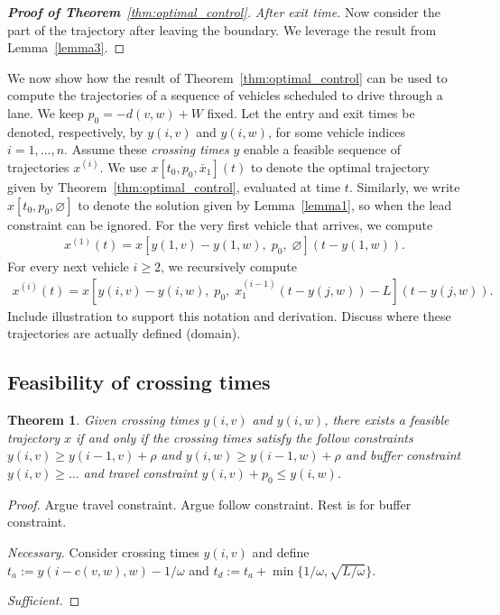 \documentclass[a4paper]{article}
\theoremstyle{definition}
\theoremstyle{plain}
\newtheorem{theorem}{Theorem\hspace{0.25em}\ignorespaces}
\begin{document}
\begin{proof}[\normalfont\textbf{Proof of Theorem}~\ref{thm:optimal_control}]
\vspace{0.5em}
\noindent
\textit{After exit time.}\; Now consider the part of the trajectory after
leaving the boundary. We leverage the result from Lemma~\ref{lemma3}.
\end{proof}

We now show how the result of Theorem~\ref{thm:optimal_control} can be used to
compute the trajectories of a sequence of vehicles scheduled to drive through a
lane. We keep $p_{0} = -d(v,w) + W$ fixed.
%
Let the entry and exit times be denoted, respectively, by $y(i, v)$ and
$y(i, w)$, for some vehicle indices $i = 1, \dots, n$. Assume these
\textit{crossing times} $y$ enable a feasible sequence of trajectories $x^{(i)}$.
%
We use $x[t_{0}, p_{0}, \bar{x}_{1}](t)$ to denote the optimal trajectory given
by Theorem~\ref{thm:optimal_control}, evaluated at time $t$. Similarly, we write
$x[t_{0}, p_{0}, \varnothing]$ to denote the solution given by
Lemma~\ref{lemma1}, so when the lead constraint can be ignored.
%
For the very first vehicle that arrives, we compute
\begin{align*}
  x^{(1)}(t) = x[y(1,v)-y(1,w), \; p_{0}, \; \varnothing](t - y(1,w)) .
\end{align*}
For every next vehicle $i \geq 2$, we recursively compute
\begin{align*}
  x^{(i)}(t) = x[y(i,v)-y(i,w), \; p_{0}, \; x_{1}^{(i-1)}(t - y(j,w)) - L](t - y(j, w)) .
\end{align*}
{\color{Navy} Include illustration to support this notation and derivation.
Discuss where these trajectories are actually defined (domain).}


\newpage
\subsection{Feasibility of crossing times}

\begin{theorem}
  Given crossing times $y(i, v)$ and $y(i, w)$, there exists a feasible
  trajectory $x$ if and only if the crossing times satisfy the follow constraints
  $y(i, v) \geq y(i-1, v) + \rho$ and $y(i, w) \geq y(i-1, w) + \rho$ and buffer constraint $y(i, v) \geq \dots$ and
  travel constraint $y(i, v) + p_{0} \leq y(i, w)$.
\end{theorem}
\begin{proof}
  Argue travel constraint. Argue follow constraint. Rest is for buffer constraint.

\vspace{0.5em}
\noindent
\textit{Necessary.}\;
  Consider crossing times $y(i, v)$ and define
  $t_{a} := y(i - c(v,w), w) - 1/\omega$ and $t_{d} := t_{a} + \min\{1/\omega, \sqrt{L/\omega}\}$.

\vspace{0.5em}
\noindent
\textit{Sufficient.}\;
\end{proof}
\end{document}
